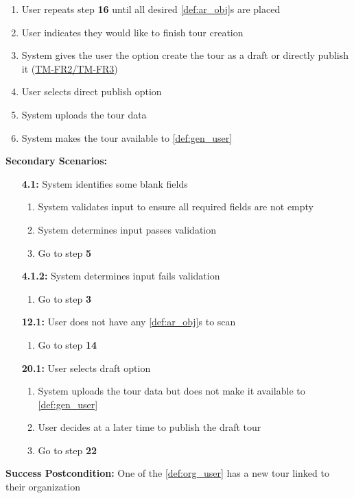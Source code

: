 \documentclass{article}
\begin{document}
\begin{enumerate}[label=\textbf{UC\arabic*}]
\begin{enumerate}[label=\textbf{\arabic*.}]
              \item User repeats step \textbf{16} until all desired \ref{def:ar_obj}s are placed
              \item User indicates they would like to finish tour creation
              \item System gives the user the option create the tour as a draft or directly publish it (\hyperref[ssub:tour_management]{TM-FR2/TM-FR3})
              \item User selects direct publish option
              \item System uploads the tour data
              \item System makes the tour available to \ref{def:gen_user}
          \end{enumerate}

          \textbf{Secondary Scenarios:}
          \begin{itemize}
              \item[{\bf 4.1:}] System identifies some blank fields
                    \begin{enumerate}[label=\textbf{\arabic*.}]
                        \item System validates input to ensure all required fields are not empty
                        \item System determines input passes validation
                        \item Go to step \textbf{5}
                    \end{enumerate}
              \item[{\bf 4.1.2:}] System determines input fails validation
                    \begin{enumerate}[label=\textbf{\arabic*.}]
                        \item Go to step \textbf{3}
                    \end{enumerate}
              \item[{\bf 12.1:}] User does not have any \ref{def:ar_obj}s to scan
                    \begin{enumerate}[label=\textbf{\arabic*.}]
                        \item Go to step \textbf{14}
                    \end{enumerate}
              \item[{\bf 20.1:}] User selects draft option
                    \begin{enumerate}[label=\textbf{\arabic*.}]
                        \item System uploads the tour data but does not make it available to \ref{def:gen_user}
                        \item User decides at a later time to publish the draft tour
                        \item Go to step \textbf{22}
                    \end{enumerate}
          \end{itemize}
          \textbf{Success Postcondition:} One of the \ref{def:org_user} has a new tour linked to their organization


\end{enumerate}
\end{document}
